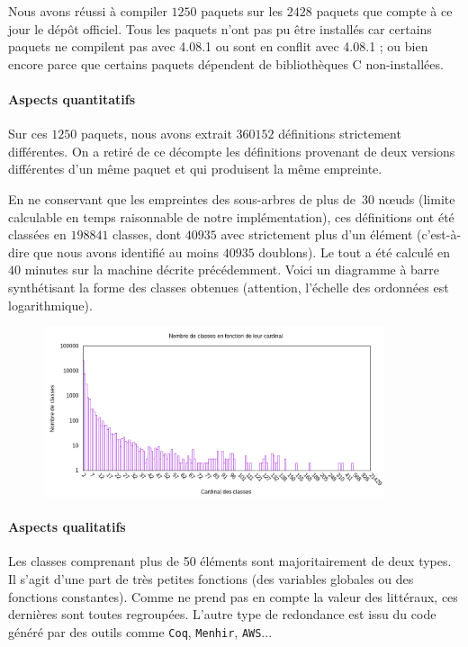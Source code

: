 Nous avons réussi à compiler $1250$ paquets sur les $2428$ paquets que
compte à ce jour le dépôt {\Opam} officiel. Tous les paquets n'ont pas
pu être installés car
certains paquets ne compilent pas avec {\OCaml} 4.08.1 ou
sont en conflit avec {\OCaml} 4.08.1 ; ou bien encore parce que
certains paquets dépendent de bibliothèques C non-installées.

\paragraph{Aspects quantitatifs}

Sur ces $1250$ paquets, nous avons extrait $360152$ définitions
strictement différentes. On a retiré de ce décompte les définitions
provenant de deux versions différentes d'un même paquet et qui
produisent la même empreinte.

En ne conservant que les empreintes des sous-arbres de plus de~$30$
nœuds (limite calculable en temps raisonnable de notre
implémentation), ces définitions ont été classées en $198841$ classes,
dont $40935$ avec strictement plus d'un élément (c'est-à-dire que nous
avons identifié au moins $40935$ doublons). Le tout a été calculé en
$40$ minutes sur la machine décrite précédemment. Voici un diagramme à
barre synthétisant la forme des classes obtenues (attention,
l'échelle des ordonnées est logarithmique).

\begin{figure}[h]
\begin{center}
\includegraphics[width=10cm]{figures/bars.png}
\end{center}
\end{figure}

\paragraph{Aspects qualitatifs}

Les classes comprenant plus de 50 éléments sont majoritairement de
deux types. Il s'agit d'une part de très petites fonctions (des
variables globales ou des fonctions constantes). Comme {\Asak} ne
prend pas en compte la valeur des littéraux, ces dernières sont toutes
regroupées. L'autre type de redondance est issu du code généré par des
outils comme \verb|Coq|, \verb|Menhir|, \verb|AWS|...

